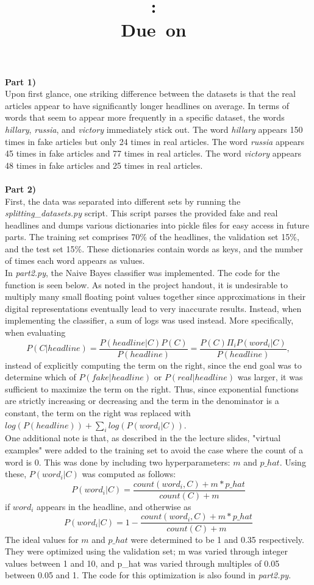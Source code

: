 \documentclass{article}
\title{
\vspace{2in}
\textmd{\textbf{\hmwkClass:\ \hmwkTitle}}\\
\normalsize\vspace{0.1in}\small{Due\ on\ \hmwkDueDate}\\
\vspace{0.1in}
\vspace{3in}
}
\author{\textbf{\hmwkAuthorName}}
\date{} %
\begin{document}
\maketitle
\clearpage
\textbf{Part 1)}\\
Upon first glance, one striking difference between the datasets is that the real articles appear to have significantly longer headlines on average. In terms of words that seem to appear more frequently in a specific dataset, the words \textit{hillary}, \textit{russia}, and \textit{victory} immediately stick out. The word \textit{hillary} appears 150 times in fake articles but only 24 times in real articles. The word \textit{russia} appears 45 times in fake articles and 77 times in real articles. The word \textit{victory} appears 48 times in fake articles and 25 times in real articles.\\\\
\textbf{Part 2)}\\
First, the data was separated into different sets by running the \textit{splitting\_datasets.py} script. This script parses the provided fake and real headlines and dumps various dictionaries into pickle files for easy access in future parts. The training set comprises 70\% of the headlines, the validation set 15\%, and the test set 15\%. These dictionaries contain words as keys, and the number of times each word appears as values.\\

In \textit{part2.py}, the Naive Bayes classifier was implemented. The code for the function is seen below. As noted in the project handout, it is undesirable to multiply many small floating point values together since approximations in their digital representations eventually lead to very inaccurate results. Instead, when implementing the classifier, a sum of logs was used instead. More specifically, when evaluating $$P(C|headline)=\frac{P(headline|C)P(C)}{P(headline)}=\frac{P(C)\Pi_{i}P(word_i|C)}{P(headline)},$$ instead of explicitly computing the term on the right, since the end goal was to determine which of $P(fake|headline)$ or $P(real|headline)$ was larger, it was sufficient to maximize the term on the right. Thus, since exponential functions are strictly increasing or decreasing and the term in the denominator is a constant, the term on the right was replaced with 
$log(P(headline))+\sum_{i}log(P(word_i|C))$.\\

One additional note is that, as described in the the lecture slides, "virtual examples" were added to the training set to avoid the case where the count of a word is 0. This was done by including two hyperparameters: $m$ and $p\_hat$. Using these, $P(word_i|C)$ was computed as follows:
$$P(word_i|C)=\frac{count(word_i,C) + m*p\_hat}{count(C)+m} $$ if $word_i$ appears in the headline, and otherwise as
$$P(word_i|C)=1-\frac{count(word_i,C) + m*p\_hat}{count(C)+m} $$
The ideal values for $m$ and $p\_hat$ were determined to be 1 and 0.35 respectively. They were optimized using the validation set; m was varied through integer values between 1 and 10, and p\_hat was varied through multiples of 0.05 between 0.05 and 1. The code for this optimization is also found in \textit{part2.py}.\\
\end{document}
